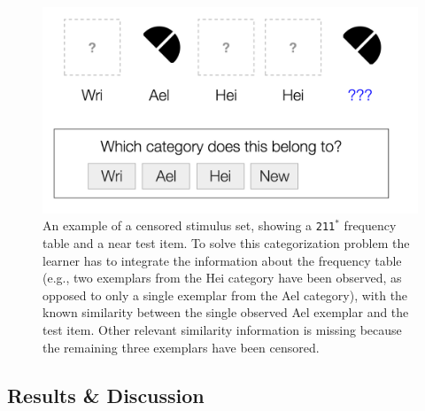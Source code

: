 \documentclass[doc]{apa6}
\newcommand{\dist}[1]{\texttt{#1}}
\begin{document}
\begin{figure}[t]
\begin{center}
\includegraphics[scale=.3]{censored.png}
\caption{An example of a censored stimulus set, showing a \dist{211$^*$} frequency table and a near test item. To solve this categorization problem the learner has to integrate the information about the frequency table (e.g., two exemplars from the Hei category have been observed, as opposed to only a single exemplar from the Ael category), with the known similarity between the single observed Ael exemplar and the test item. Other relevant similarity information is missing because the remaining three exemplars have been censored.}
\label{fig:censoring}
\end{center}
\end{figure}



\subsection{Results \& Discussion}
\end{document}
